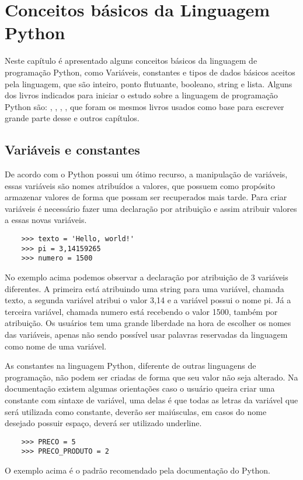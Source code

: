 

\chapter{ Conceitos básicos da Linguagem Python}

Neste capítulo é apresentado alguns conceitos básicos da linguagem de programação Python, como Variáveis, constantes e tipos de dados básicos aceitos pela linguagem, que são inteiro, ponto flutuante, booleano, string e lista. Alguns dos livros indicados para iniciar o estudo sobre a linguagem de programação Python são:  \cite{Lutz2007}, \cite{Perkovic2016}, \cite{Severance2016}, \cite{Borges2014}, que foram os mesmos livros usados como base para escrever grande parte desse e outros capítulos.

    \section{Variáveis e constantes}
	De acordo com \cite{Severance2016} o Python possui um ótimo recurso, a manipulação de variáveis, essas variáveis são nomes atribuídos a valores, que possuem como propósito armazenar valores de forma que possam ser recuperados mais tarde. 
	Para criar variáveis é necessário fazer uma declaração por atribuição e assim atribuir valores a essas novas variáveis. 
	\begin{lstlisting}
	>>> texto = 'Hello, world!'
	>>> pi = 3,14159265
	>>> numero = 1500
	\end{lstlisting}
	No exemplo acima podemos observar a declaração por atribuição de 3 variáveis diferentes. A primeira está atribuindo uma string para uma variável, chamada texto, a segunda variável atribui o valor 3,14 e a variável possui o nome pi. Já a terceira variável, chamada numero está recebendo o valor 1500, também por atribuição. Os usuários tem uma grande liberdade na hora de escolher os nomes das variáveis, apenas não sendo possível usar palavras reservadas da linguagem como nome de uma variável.
	
	As constantes na linguagem Python, diferente de outras linguagens de programação, não podem ser criadas de forma que seu valor não seja alterado. Na documentação existem algumas orientações caso o usuário queira criar uma constante com sintaxe de variável, uma delas é que todas as letras da variável que será utilizada como constante, deverão ser maiúsculas, em casos do nome desejado possuir espaço, deverá ser utilizado underline.
	\begin{lstlisting}
	>>> PRECO = 5
	>>> PRECO_PRODUTO = 2
	\end{lstlisting}
	O exemplo acima é o padrão recomendado pela documentação do Python.

